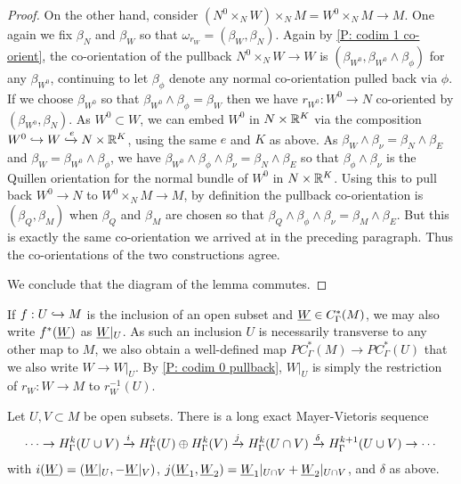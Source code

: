 \begin{proof}
	On the other hand, consider $(N^0 \times_N W) \times_N M = W^0 \times_N M \to M$. One again we fix $\beta_N$ and $\beta_W$ so that $\omega_{r_W} = (\beta_W,\beta_N)$. Again by \cref{P: codim 1 co-orient}, the co-orientation of the pullback $N^0 \times_N W \to W$ is $(\beta_{W^0},\beta_{W^0} \wedge \beta_\phi)$ for any $\beta_{W^0}$, continuing to let $\beta_\phi$ denote any normal co-orientation pulled back via $\phi$. If we choose $\beta_{W^0}$ so that $\beta_{W^0} \wedge \beta_\phi = \beta_W$ then we have $r_{W^0} \colon W^0 \to N$ co-oriented by $(\beta_{W^0},\beta_N)$. As $W^0 \subset W$, we can embed $W^0$ in $N \times \mathbb{R}^K$ via the composition $W^0 \hookrightarrow W \xhookrightarrow{e}N \times \mathbb{R}^K$, using the same $e$ and $K$ as above. As $\beta_W \wedge \beta_\nu = \beta_N \wedge \beta_E$ and $\beta_W = \beta_{W^0} \wedge \beta_\phi$, we have $\beta_{W^0} \wedge \beta_\phi \wedge \beta_\nu = \beta_N \wedge \beta_E$ so that $\beta_\phi \wedge \beta_\nu$ is the Quillen orientation for the normal bundle of $W^0$ in $N \times \mathbb{R}^K$. Using this to pull back $W^0 \to N$ to $W^0 \times_N M \to M$, by definition the pullback co-orientation is $(\beta_Q,\beta_M)$ when $\beta_Q$ and $\beta_M$ are chosen so that $\beta_Q \wedge \beta_\phi \wedge \beta_\nu = \beta_M \wedge \beta_E$. But this is exactly the same co-orientation we arrived at in the preceding paragraph. Thus the co-orientations of the two constructions agree.

	We conclude that the diagram of the lemma commutes.
\end{proof}

\begin{notation}
	If $f: U \hookrightarrow M$ is the inclusion of an open subset and $\underline{W} \in C^*_\Gamma(M)$, we may also write $f^*(\underline{W})$ as $\underline{W}|_U$. As such an inclusion $U$ is necessarily transverse to any other map to $M$, we also obtain a well-defined map $PC^*_\Gamma(M) \to PC^*_\Gamma(U)$ that we also write $W \to W|_U$. By \cref{P: codim 0 pullback}, $W|_U$ is simply the restriction of $r_W \colon W \to M$ to $r_W^{-1}(U)$.
\end{notation}

\begin{theorem}\label{T: absolute MV}
	Let $U,V \subset M$ be open subsets. There is a long exact Mayer-Vietoris sequence
	$$\cdots \to H^k_\Gamma(U \cup V) \xrightarrow{i} H^k_\Gamma(U) \oplus H^k_\Gamma(V) \xrightarrow{j} H^k_\Gamma(U \cap V) \xrightarrow{\delta} H^{k+1}_\Gamma(U \cup V)\to\cdots$$
	with $i(\underline{W}) = (\underline{W}|_U, -\underline{W}|_V)$, $j(\underline{W}_1,\underline{W}_2) = \underline{W}_1|_{U \cap V}+\underline{W}_2|_{U \cap V}$, and $\delta$ as above.
\end{theorem}

